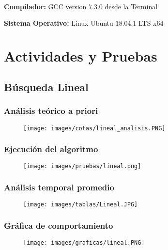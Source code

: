 \documentclass[12pt]{article}
\begin{document}
	    \textbf{Compilador:} GCC version 7.3.0 desde la Terminal
	    
	    \textbf{Sistema Operativo:} Linux Ubuntu 18.04.1 LTS x64 

	
	\section{Actividades y Pruebas}
	
	    \subsection{Búsqueda Lineal}
	        \subsubsection{Análisis teórico a priori}
	        \begin{figure}[H]
			    	   \centering
			    	   \texttt{[image: images/cotas/lineal\_analisis.PNG]}
			    \end{figure}
	        
	        \subsubsection{Ejecución del algoritmo}
            	\begin{figure}[H]
                	   \centering
                	   \texttt{[image: images/pruebas/lineal.png]}
                \end{figure}
	        
	        \subsubsection{Análisis temporal promedio}
            	\begin{figure}[H]
            	    \centering
                	   \texttt{[image: images/tablas/Lineal.JPG]}
                \end{figure}
        	
        	\subsubsection{Gráfica de comportamiento}
            	\begin{figure}[H]
            	    \centering
                	   \texttt{[image: images/graficas/lineal.PNG]}
                \end{figure}
    
\end{document}
